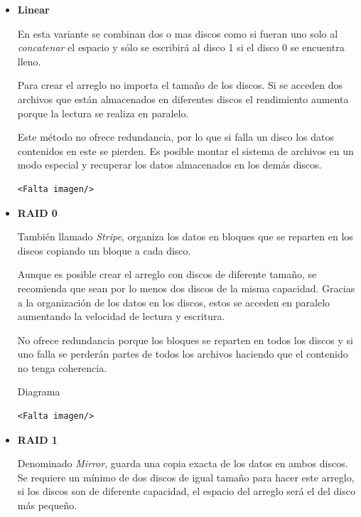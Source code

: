 \begin{itemize}

  \item \textbf{Linear}

En esta variante se combinan dos o mas discos como si fueran uno solo al \emph{concatenar} el espacio y s\'{o}lo se escribir\'{a} al disco 1 si el disco 0 se encuentra lleno.

Para crear el arreglo no importa el tama\~{n}o de los discos. Si se acceden dos archivos que est\'{a}n almacenados en diferentes discos el rendimiento aumenta porque la lectura se realiza en paralelo.

Este m\'{e}todo no ofrece redundancia, por lo que si falla un disco los datos contenidos en este se pierden. Es posible montar el sistema de archivos en un modo especial y recuperar los datos almacenados en los dem\'{a}s discos.

{\large\begin{verbatim}<Falta imagen/>\end{verbatim}}

  \item \textbf{RAID 0}

Tambi\'{e}n llamado \emph{Stripe}, organiza los datos en bloques que se reparten en los discos copiando un bloque a cada disco.

Aunque es posible crear el arreglo con discos de diferente tama\~{n}o, se recomienda que sean por lo menos dos discos de la misma capacidad. Gracias a la organizaci\'{o}n de los datos en los discos, estos se acceden en paralelo aumentando la velocidad de lectura y escritura.

No ofrece redundancia porque los bloques se reparten en todos los discos y si uno falla se perder\'{a}n partes de todos los archivos haciendo que el contenido no tenga coherencia.

Diagrama \cite{18b4e676f432f4780a509b508056c779}
{\large\begin{verbatim}<Falta imagen/>\end{verbatim}}

  \item \textbf{RAID 1}
  
Denominado \emph{Mirror}, guarda una copia exacta de los datos en ambos discos. Se requiere un m\'{i}nimo de dos discos de igual tama\~{n}o para hacer este arreglo, si los discos son de diferente capacidad, el espacio del arreglo ser\'{a} el del disco m\'{a}s peque\~{n}o.


\end{itemize}

